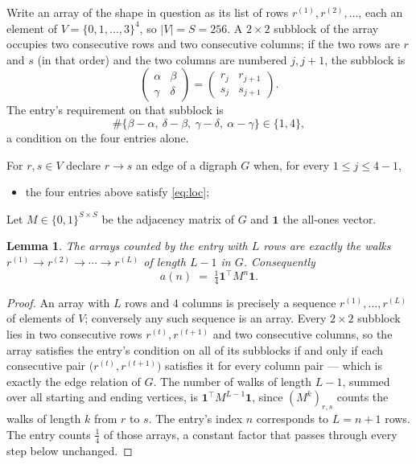 \documentclass[11pt,a4paper]{article}
\theoremstyle{plain}
\newtheorem{lemma}[theorem]{Lemma}
\theoremstyle{definition}
\begin{document}
Write an array of the shape in question as its list of rows
$r^{(1)},r^{(2)},\dots$, each an element of
$V=\{0,1,\dots,3\}^{4}$, so $|V|=S=256$. A $2\times2$ subblock of the array
occupies two consecutive rows and two consecutive columns; if the two rows are $r$
and $s$ (in that order) and the two columns are numbered $j,j+1$,
the subblock is
\[
\begin{pmatrix}\alpha&\beta\\\gamma&\delta\end{pmatrix}=\begin{pmatrix}r_j&r_{j+1}\\s_j&s_{j+1}\end{pmatrix}.
\]
The entry's requirement on that subblock is
\begin{equation}\label{eq:loc}
\#\{\beta-\alpha,\ \delta-\beta,\ \gamma-\delta,\ \alpha-\gamma\}\in\{1,4\},
\end{equation}
a condition on the four entries alone.

For $r,s\in V$ declare $r\to s$ an edge of a digraph $G$ when, for every
$1\le j\le 4-1$,
\begin{itemize}
\item the four entries above satisfy \eqref{eq:loc};

\end{itemize}
Let $M\in\{0,1\}^{S\times S}$ be the adjacency matrix of $G$ and $\mathbf{1}$ the
all-ones vector.

\begin{lemma}\label{lem:walk}
The arrays counted by the entry with $L$ rows are exactly the walks
$r^{(1)}\to r^{(2)}\to\cdots\to r^{(L)}$ of length $L-1$ in $G$. Consequently
\[
a(n)\;=\;\tfrac1{4}\mathbf{1}^{\!\top}M^{n}\mathbf{1} .
\]
\end{lemma}

\begin{proof}
An array with $L$ rows and $4$ columns is precisely a sequence
$r^{(1)},\dots,r^{(L)}$ of elements of $V$; conversely any such sequence is an array.
Every $2\times2$ subblock lies in two consecutive rows $r^{(t)},r^{(t+1)}$ and two
consecutive columns, so the array satisfies the entry's condition on all of its subblocks
if and only if each consecutive pair $\bigl(r^{(t)},r^{(t+1)}\bigr)$ satisfies it for
every column pair --- which is exactly the edge relation of $G$. The number of walks of
length $L-1$, summed over all starting and ending vertices, is
$\mathbf{1}^{\!\top}M^{L-1}\mathbf{1}$, since $(M^{k})_{r,s}$ counts the walks of
length $k$ from $r$ to $s$. The entry's index $n$ corresponds to $L=n+1$ rows. The entry counts $\tfrac1{4}$ of those arrays, a constant factor that passes through every step below unchanged.
\end{proof}
\end{document}
